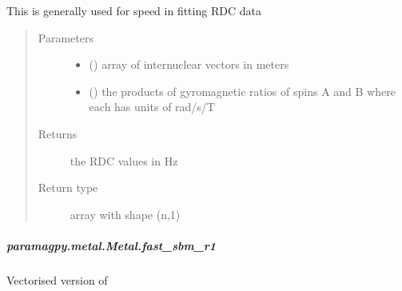 \documentclass[a4paper,10pt,english,openany,oneside]{sphinxmanual}
\begin{document}
\begin{fulllineitems}
\begin{fulllineitems}
\begin{fulllineitems}
This is generally used for speed in fitting RDC data
\begin{quote}\begin{description}
\item[{Parameters}] \leavevmode\begin{itemize}
\item {} 
 (\sphinxstyleliteralemphasis{\sphinxupquote{ (}}\sphinxstyleliteralemphasis{\sphinxupquote{,}}\sphinxstyleliteralemphasis{\sphinxupquote{)}}) \textendash{} array of internuclear vectors in meters

\item {} 
 (\sphinxstyleliteralemphasis{\sphinxupquote{ (}}\sphinxstyleliteralemphasis{\sphinxupquote{,}}\sphinxstyleliteralemphasis{\sphinxupquote{)}}) \textendash{} the products of gyromagnetic ratios of spins A and B
where each has units of rad/s/T

\end{itemize}

\item[{Returns}] \leavevmode
{} \textendash{} the RDC values in Hz

\item[{Return type}] \leavevmode
array with shape (n,1)

\end{description}\end{quote}

\end{fulllineitems}



\subparagraph{paramagpy.metal.Metal.fast\_sbm\_r1}
\label{\detokenize{reference/generated/paramagpy.metal.Metal.fast_sbm_r1:paramagpy-metal-metal-fast-sbm-r1}}\label{\detokenize{reference/generated/paramagpy.metal.Metal.fast_sbm_r1::doc}}

\begin{fulllineitems}
\label{\detokenize{reference/generated/paramagpy.metal.Metal.fast_sbm_r1:paramagpy.metal.Metal.fast_sbm_r1}}
Vectorised version of {\hyperref[\detokenize{reference/generated/paramagpy.metal.Metal.sbm_r1:paramagpy.metal.Metal.sbm_r1}]{}}


\end{fulllineitems}
\end{fulllineitems}
\end{fulllineitems}
\end{document}
